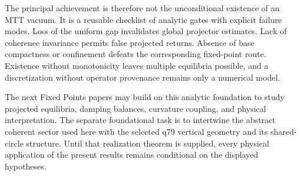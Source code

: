 \documentclass[11pt]{article}
\begin{document}
The principal achievement is therefore not the unconditional existence of an
MTT vacuum.  It is a reusable checklist of analytic gates with explicit
failure modes.  Loss of the uniform gap invalidates global projector
estimates.  Lack of coherence invariance permits false projected returns.
Absence of base compactness or confinement defeats the corresponding
fixed-point route.  Existence without monotonicity leaves multiple equilibria
possible, and a discretization without operator provenance remains only a
numerical model.

The next Fixed Points papers may build on this analytic foundation to study
projected equilibria, damping balances, curvature coupling, and physical
interpretation.  The separate foundational task is to intertwine the abstract
coherent sector used here with the selected q79 vertical geometry and its
shared-circle structure.  Until that realization theorem is supplied, every
physical application of the present results remains conditional on the
displayed hypotheses.



\end{document}
